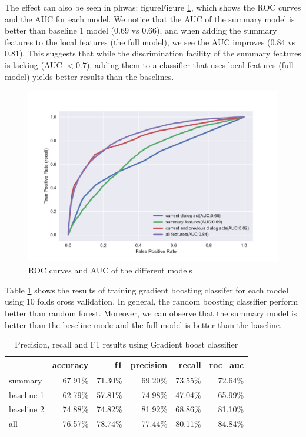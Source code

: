 The effect can also be seen in ph{was: figure}Figure \ref{auc}, which shows the ROC curves and the AUC for each
model. We notice that the AUC of the summary model is better than baseline 1 model ($0.69$ vs $0.66$), and when adding the summary features to the local features (the full model), we see the AUC improves ($0.84$ vs $0.81$). This suggests that while the discrimination facility of the summary features is lacking (AUC $<0.7$), adding them to a classifier that uses local features (full model) yields better results than the baselines.
%
 \begin{figure}[ht!]
 \centering
 \includegraphics[width=\textwidth]{../scikitlearn/figures/roc.pdf}\vspace{-1.5em}
 \caption{ROC curves and AUC of the different models \label{overflow}}
\label{auc}
 \end{figure}

Table \ref{table:result2} shows the results of training gradient boosting classifer for each model using 10 folds cross validation. In general, the random boosting classifier perform better than random forest. Moreover, we can observe that the summary model is better than the beseline mode and the full model is better than the baseline.

\begin{table}[ht!]
\begin{center}
\begin{tabular}{lrrrrr}
\toprule
{} &  accuracy &        f1 &  precision &    recall &   roc\_auc \\
\midrule
summary    &  67.91\% &  71.30\% &   69.20\% &  73.55\% &  72.64\% \\
baseline 1 &  62.79\% &  57.81\% &   74.98\% &  47.04\% &  65.99\% \\
baseline 2 &  74.88\% &  74.82\% &   81.92\% &  68.86\% &  81.10\% \\
all        &  76.57\% &  78.74\% &   77.44\% &  80.11\% &  84.84\% \\
\bottomrule
\end{tabular}
\end{center}
\caption{Precision, recall and F1 results using Gradient boost classifier }
\label{table:result2}
\end{table}


